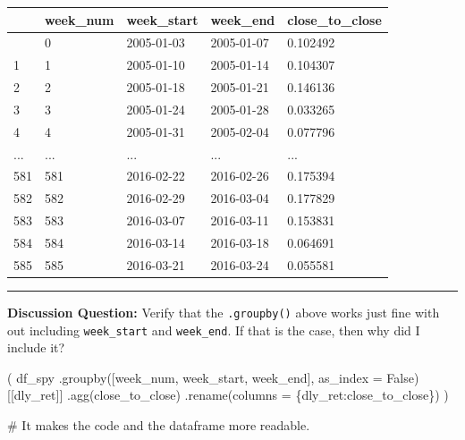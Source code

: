 \documentclass[
  letterpaper,
  DIV=11,
  numbers=noendperiod]{scrreprt}
\newenvironment{Shaded}{\begin{snugshade}}{\end{snugshade}}
\newcommand{\CommentTok}[1]{\textcolor[rgb]{0.37,0.37,0.37}{#1}}
\newcommand{\NormalTok}[1]{\textcolor[rgb]{0.00,0.23,0.31}{#1}}
\newcommand{\OperatorTok}[1]{\textcolor[rgb]{0.37,0.37,0.37}{#1}}
\newcommand{\StringTok}[1]{\textcolor[rgb]{0.13,0.47,0.30}{#1}}
\newcommand{\VariableTok}[1]{\textcolor[rgb]{0.07,0.07,0.07}{#1}}
\begin{document}
\begin{longtable}[]{@{}lllll@{}}
\toprule\noalign{}
& week\_num & week\_start & week\_end & close\_to\_close \\
\midrule\noalign{}
\endhead
\bottomrule\noalign{}
\endlastfoot
0 & 0 & 2005-01-03 & 2005-01-07 & 0.102492 \\
1 & 1 & 2005-01-10 & 2005-01-14 & 0.104307 \\
2 & 2 & 2005-01-18 & 2005-01-21 & 0.146136 \\
3 & 3 & 2005-01-24 & 2005-01-28 & 0.033265 \\
4 & 4 & 2005-01-31 & 2005-02-04 & 0.077796 \\
... & ... & ... & ... & ... \\
581 & 581 & 2016-02-22 & 2016-02-26 & 0.175394 \\
582 & 582 & 2016-02-29 & 2016-03-04 & 0.177829 \\
583 & 583 & 2016-03-07 & 2016-03-11 & 0.153831 \\
584 & 584 & 2016-03-14 & 2016-03-18 & 0.064691 \\
585 & 585 & 2016-03-21 & 2016-03-24 & 0.055581 \\
\end{longtable}

\begin{center}\rule{0.5\linewidth}{0.5pt}\end{center}

\textbf{Discussion Question:} Verify that the \texttt{.groupby()} above
works just fine with out including \texttt{week\_start} and
\texttt{week\_end}. If that is the case, then why did I include it?

\begin{Shaded}
\begin{Highlighting}[]
\NormalTok{(}
\NormalTok{df\_spy}
\NormalTok{    .groupby([}\StringTok{\textquotesingle{}week\_num\textquotesingle{}}\NormalTok{, }\StringTok{\textquotesingle{}week\_start\textquotesingle{}}\NormalTok{, }\StringTok{\textquotesingle{}week\_end\textquotesingle{}}\NormalTok{], as\_index }\OperatorTok{=} \VariableTok{False}\NormalTok{)[[}\StringTok{\textquotesingle{}dly\_ret\textquotesingle{}}\NormalTok{]]}
\NormalTok{    .agg(close\_to\_close)}
\NormalTok{    .rename(columns }\OperatorTok{=}\NormalTok{ \{}\StringTok{\textquotesingle{}dly\_ret\textquotesingle{}}\NormalTok{:}\StringTok{\textquotesingle{}close\_to\_close\textquotesingle{}}\NormalTok{\})}
\NormalTok{)}

\CommentTok{\# It makes the code and the dataframe more readable.}
\end{Highlighting}
\end{Shaded}
\end{document}
